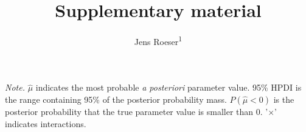 \documentclass[
  english,
  ,man,mask,floatsintext]{apa7}
\author{Jens Roeser\textsuperscript{1}}
\affiliation{
\vspace{0.5cm}
\textsuperscript{1} Nottingham Trent University}
\title{Supplementary material}
\date{}
\begin{document}
\maketitle



\clearpage
\makeatletter
\efloat@restorefloats
\makeatother


\begin{appendix}
\section{}
\begin{center}
\begin{ThreePartTable}

\begin{TableNotes}[para]
\normalsize{\textit{Note.} $\hat{\mu}$ indicates the most probable \textit{a posteriori} parameter value. 95\% HPDI is the range containing 95\% of the posterior probability mass. $P(\hat{\mu}<0)$ is the posterior probability that the true parameter value is smaller than 0. '$\times$' indicates interactions.}
\end{TableNotes}

\small{

}
\end{ThreePartTable}
\end{center}
\end{appendix}
\end{document}

